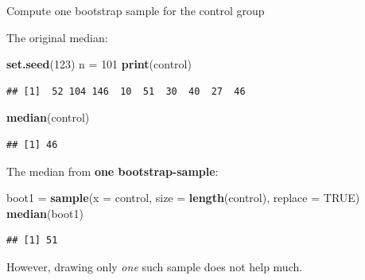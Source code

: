 \documentclass[
  10pt,
  ignorenonframetext,
]{beamer}
\newenvironment{Shaded}{\begin{snugshade}}{\end{snugshade}}
\newcommand{\AttributeTok}[1]{\textcolor[rgb]{0.13,0.29,0.53}{#1}}
\newcommand{\ConstantTok}[1]{\textcolor[rgb]{0.56,0.35,0.01}{#1}}
\newcommand{\DecValTok}[1]{\textcolor[rgb]{0.00,0.00,0.81}{#1}}
\newcommand{\FunctionTok}[1]{\textcolor[rgb]{0.13,0.29,0.53}{\textbf{#1}}}
\newcommand{\NormalTok}[1]{#1}
\newcommand{\OtherTok}[1]{\textcolor[rgb]{0.56,0.35,0.01}{#1}}
\begin{document}
\begin{frame}[fragile]
Compute one bootstrap sample for the control group \(~\)

The original median: \scriptsize

\begin{Shaded}
\begin{Highlighting}[]
\FunctionTok{set.seed}\NormalTok{(}\DecValTok{123}\NormalTok{)}
\NormalTok{n }\OtherTok{=} \DecValTok{101}
\FunctionTok{print}\NormalTok{(control)}
\end{Highlighting}
\end{Shaded}

\begin{verbatim}
## [1]  52 104 146  10  51  30  40  27  46
\end{verbatim}

\begin{Shaded}
\begin{Highlighting}[]
\FunctionTok{median}\NormalTok{(control)}
\end{Highlighting}
\end{Shaded}

\begin{verbatim}
## [1] 46
\end{verbatim}

\normalsize

The median from \textbf{one bootstrap-sample}: \scriptsize

\begin{Shaded}
\begin{Highlighting}[]
\NormalTok{boot1 }\OtherTok{=} \FunctionTok{sample}\NormalTok{(}\AttributeTok{x =}\NormalTok{ control, }\AttributeTok{size =} \FunctionTok{length}\NormalTok{(control), }\AttributeTok{replace =} \ConstantTok{TRUE}\NormalTok{)}
\FunctionTok{median}\NormalTok{(boot1)}
\end{Highlighting}
\end{Shaded}

\begin{verbatim}
## [1] 51
\end{verbatim}

\normalsize

However, drawing only \emph{one} such sample does not help much.
\end{frame}
\end{document}
